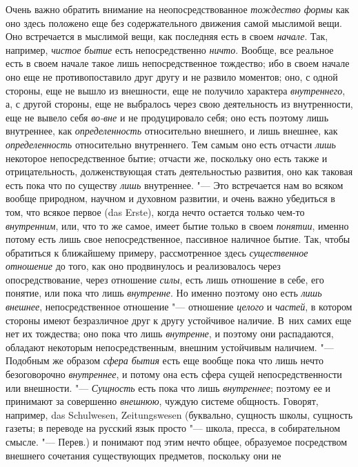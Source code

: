 Очень важно обратить внимание на неопосредствованное
{\em тождество формы} как оно здесь положено еще без
содержательного движения самой мыслимой вещи. Оно встречается в мыслимой
вещи, как последняя есть в своем {\em начале}. Так,
например, {\em чистое бытие} есть непосредственно
{\em ничто}. Вообще, все реальное есть в своем начале
такое лишь непосредственное тождество; ибо в своем начале оно еще не
противопоставило друг другу и не развило моментов; оно, с одной стороны,
еще не вышло из внешности, еще не получило характера
{\em внутреннего}, а, с другой стороны, еще не
выбралось через свою деятельность из внутренности, еще не вывело себя
{\em во-вне} и не продуцировало себя; оно есть поэтому
лишь внутреннее, как {\em определенность} относительно
внешнего, и лишь внешнее, как {\em определенность}
относительно внутреннего. Тем самым оно есть отчасти
{\em лишь} некоторое непосредственное бытие; отчасти
же, поскольку оно есть также и отрицательность, долженствующая стать
деятельностью развития, оно как таковая есть пока что по существу
{\em лишь} внутреннее. "--- Это встречается нам во всяком
вообще природном, научном и духовном развитии, и очень важно убедиться в
том, что всякое первое (das Erste), когда нечто остается только чем-то
{\em внутренним}, или, что то же самое, имеет бытие
только в своем {\em понятии}, именно потому есть лишь
свое непосредственное, пассивное наличное бытие. Так, чтобы обратиться к
ближайшему примеру, рассмотренное здесь
{\em существенное отношение} до того, как оно
продвинулось и реализовалось через опосредствование, через отношение
{\em силы}, есть лишь отношение в себе, его понятие,
или пока что лишь {\em внутренне}. Но именно поэтому
оно есть {\em лишь внешнее}, непосредственное отношение
"--- отношение {\em целого} и
{\em частей}, в котором стороны имеют безразличное друг
к другу устойчивое наличие. В~них самих еще нет их тождества; оно пока что
лишь {\em внутренне}, и поэтому они распадаются,
обладают некоторым непосредственным, внешним устойчивым наличием. "---
Подобным же образом {\em сфера бытия} есть еще вообще
пока что лишь нечто безоговорочно {\em внутреннее}, и
потому она есть сфера сущей непосредственности или внешности. "---
{\em Сущность} есть пока что лишь
{\em внутреннее}; поэтому ее и принимают за совершенно
{\em внешнюю}, чуждую системе общность. Говорят,
например, das Schulwesen, Zeitungswesen (буквально, сущность школы,
сущность газеты; в переводе на русский язык просто "--- школа, пресса, в
собирательном смысле. "--- Перев.) и понимают под этим нечто общее, образуемое
посредством внешнего сочетания существующих предметов, поскольку они не
